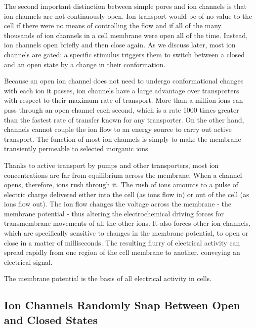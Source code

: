 The second important distinction between simple pores and ion channels
is that ion channels are not continuously open. Ion transport would be of
no value to the cell if there were no means of controlling the flow and if
all of the many thousands of ion channels in a cell membrane were open
all of the time. Instead, ion channels open briefly and then close again.
As we discuss later, most ion channels are gated: a specific
stimulus triggers them to switch between a closed and an open state
by a change in their conformation.

Because an open ion channel does not need to undergo conformational
changes with each ion it passes, ion channels have a large advantage
over transporters with respect to their maximum rate of transport. More
than a million ions can pass through an open channel each second, which
is a rate 1000 times greater than the fastest rate of transfer known for
any transporter. On the other hand, channels cannot couple the ion flow
to an energy source to carry out active transport. The function of most
ion channels is simply to make the membrane transiently permeable to
selected inorganic ions

Thanks to active transport by pumps and other transporters, most ion
concentrations are far from equilibrium across the membrane. When a
channel opens, therefore, ions rush through it. The rush of ions amounts
to a pulse of electric charge delivered either into the cell (as ions flow
in) or out of the cell (as ions flow out). The ion flow changes the voltage
across the membrane - the membrane potential - thus altering the
electrochemical driving forces for transmembrane movements of all the
other ions. It also forces other ion channels, which are specifically sensitive
to changes in the membrane potential, to open or close in a matter of
milliseconds. The resulting flurry of electrical activity can spread rapidly
from one region of the cell membrane to another, conveying an electrical
signal.

The membrane potential is the basis of all electrical activity in cells.

\subsection{Ion Channels Randomly Snap Between Open and Closed States}

